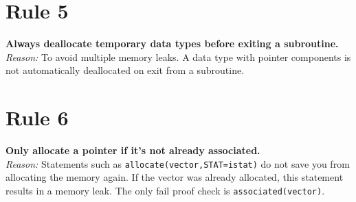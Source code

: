 \documentclass[12pt]{article}
\begin{document}
\section*{Rule 5} \textbf{Always deallocate temporary data types
before exiting a subroutine.}\\

\emph{Reason:} To avoid multiple memory leaks. A data type with
pointer components is not automatically deallocated on exit from a
subroutine.


\section*{Rule 6} \textbf{Only allocate a pointer if it's not already
associated.}\\

\emph{Reason:} Statements such as \verb"allocate(vector,STAT=istat)"
do not save you from allocating the memory again. If the vector was
already allocated, this statement results in a memory leak. The only
fail proof check is \verb"associated(vector)".
\end{document}
